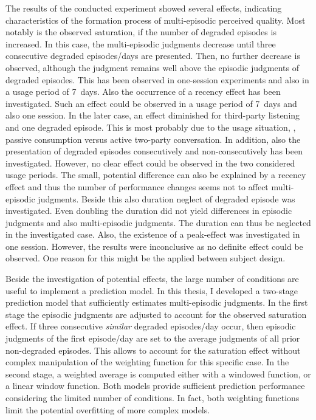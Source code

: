 The results of the conducted experiment showed several effects, indicating characteristics of the formation process of multi-episodic perceived quality.
Most notably is the observed saturation, if the number of degraded episodes is increased.
In this case, the multi-episodic judgments decrease until three consecutive degraded episodes/days are presented.
Then, no further decrease is observed, although the judgment remains well above the episodic judgments of degraded episodes.
This has been observed in one-session experiments and also in a usage period of 7~days.
Also the occurrence of a recency effect has been investigated.
Such an effect could be observed in a usage period of 7~days and also one session.
In the later case, an effect diminished for third-party listening and one degraded episode.
This is most probably due to the usage situation, \ie, passive consumption versus active two-party conversation.
In addition, also the presentation of degraded episodes consecutively and non-consecutively has been investigated.
However, no clear effect could be observed in the two considered usage periods.
The small, potential difference can also be explained by a recency effect and thus the number of performance changes seems not to affect multi-episodic judgments.
Beside this also duration neglect of degraded episode was investigated.
Even doubling the duration did not yield differences in episodic judgments and also multi-episodic judgments.
The duration can thus be neglected in the investigated case.
Also, the existence of a peak-effect was investigated in one session.
However, the results were inconclusive as no definite effect could be observed.
One reason for this might be the applied between subject design.

Beside the investigation of potential effects, the large number of conditions are useful to implement a prediction model.
In this thesis, I developed a two-stage prediction model that sufficiently estimates multi-episodic judgments.
In the first stage the episodic judgments are adjusted to account for the observed saturation effect.
If three consecutive \emph{similar} degraded episodes/day occur, then episodic judgments of the first episode/day are set to the average judgments of all prior non-degraded episodes.
This allows to account for the saturation effect without complex manipulation of the weighting function for this specific case.
In the second stage, a weighted average is computed either with a windowed function, or a linear window function.
Both models provide sufficient prediction performance considering the limited number of conditions.
In fact, both weighting functions limit the potential overfitting of more complex models.


